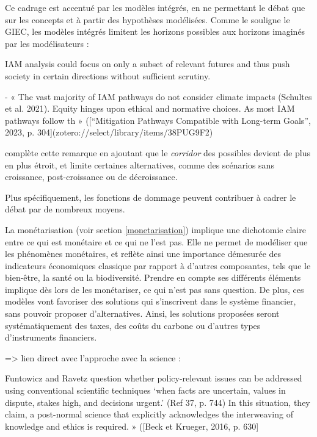 Ce cadrage est accentué par les modèles intégrés, en ne permettant le débat que sur les concepts et à partir des hypothèses modélisées. Comme le souligne le GIEC, les modèles intégrés limitent les horizons possibles aux horizons imaginés par les modélisateurs : 

\begin{displayquote}
    IAM analysis could focus on only a subset of relevant futures and thus push society in certain directions without sufficient scrutiny. \cite{intergovernmental_panel_on_climate_change_ipcc_annex_2023}
\end{displayquote}

\begin{displayquote}
    - « The vast majority of IAM pathways do not consider climate impacts (Schultes et al. 2021). Equity hinges upon ethical and normative choices. As most IAM pathways follow th » ([“Mitigation Pathways Compatible with Long-term Goals”, 2023, p. 304](zotero://select/library/items/38PUG9F2)
\end{displayquote}

\cite{cointe_ar6_2024} complète cette remarque en ajoutant que le \emph{corridor} des possibles devient de plus en plus étroit, et limite certaines alternatives, comme des scénarios sans croissance, post-croissance ou de décroissance. 

Plus spécifiquement, les fonctions de dommage peuvent contribuer à cadrer le débat par de nombreux moyens. 

La monétarisation (voir section \ref{monetarisation}) implique une dichotomie claire entre ce qui est monétaire et ce qui ne l'est pas. Elle ne permet de modéliser que les phénomènes monétaires, et reflète ainsi une importance démesurée des indicateurs économiques classique par rapport à d'autres composantes, tels que le bien-être, la santé ou la biodiversité. Prendre en compte ses différents éléments implique dès lors de les monétariser, ce qui n'est pas sans question. 
De plus, ces modèles vont favoriser des solutions qui s'inscrivent dans le système financier, sans pouvoir proposer d'alternatives. Ainsi, les solutions proposées seront systématiquement des taxes, des coûts du carbone ou d'autres types d'instruments financiers.


=> lien direct avec l'approche avec la science : 

\begin{displayquote}
    Funtowicz and Ravetz question whether policy-relevant issues can be addressed using conventional scientific techniques ‘when facts are uncertain, values in dispute, stakes high, and decisions urgent.’ (Ref 37, p. 744) In this situation, they claim, a post-normal science that explicitly acknowledges the interweaving of knowledge and ethics is required. » ([Beck et Krueger, 2016, p. 630]
\end{displayquote}


